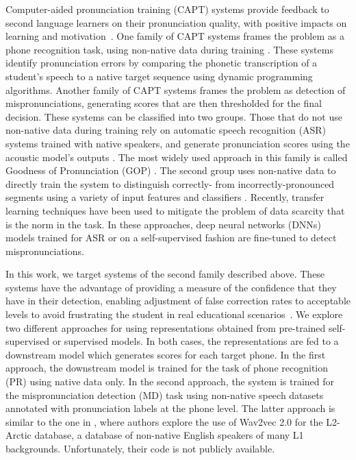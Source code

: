 \documentclass{INTERSPEECH2023}
\begin{document}
Computer-aided pronunciation training (CAPT) systems provide feedback to second language learners on their pronunciation quality, with positive impacts on learning and motivation~\cite{rogerson2021computer}.
One family of CAPT systems frames the problem as a phone recognition task, using non-native data during training \cite{li2016mispronunciation, leung2019cnn, peng2021study}. These systems identify pronunciation errors by comparing the phonetic transcription of a student's speech to a native target sequence using dynamic programming algorithms. %
Another family of CAPT systems frames the problem as detection of mispronunciations, generating scores that are then thresholded for the final decision. These systems can be classified into two groups. Those that do not use non-native data during training rely on automatic speech recognition (ASR) systems trained with native speakers, and generate pronunciation scores using the acoustic model's outputs \cite{franco1997automatic, witt2000phone, hu2015improved, shi2020context}. The most widely used approach in this family is called Goodness of Pronunciation (GOP) \cite{witt2000phone}. The second group uses non-native data to directly train the system to distinguish correctly- from incorrectly-pronounced segments using a variety of input features and classifiers \cite{ito05_interspeech, truong2004automatic, van2009automatic, yoon2010landmark, franco2014adaptive}. Recently, transfer learning techniques have been used to mitigate the problem of data scarcity that is the norm in the task. In these approaches, deep neural networks (DNNs) models trained for ASR  \cite{hu2015improved, huang2017transfer, sancinetti2022transfer, gong2022transformer} or on a self-supervised fashion \cite{xu2021explore} are fine-tuned to detect mispronunciations. 

In this work, we target systems of the second family described above. These systems have the advantage of providing a measure of the confidence that they have in their detection, enabling adjustment of false correction rates to acceptable levels to avoid frustrating the student in real educational scenarios~\cite{neri2002pedagogy}. We explore two different approaches for using representations obtained from pre-trained self-supervised or supervised models. In both cases, the representations are fed to a downstream model which generates scores for each target phone. In the first approach, the downstream model is trained for the task of phone recognition (PR) using native data only. In the second approach, the system is trained for the mispronunciation detection (MD) task using non-native speech datasets annotated with pronunciation labels at the phone level. The latter approach is similar to the one in \cite{xu2021explore}, where authors explore the use of Wav2vec 2.0 \cite{baevski2020wav2vec} for the L2-Arctic database, a database of non-native English speakers of many L1 backgrounds. Unfortunately, their code is not publicly available. 
\end{document}
